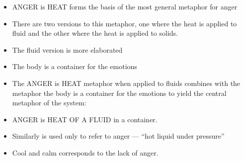 \documentclass[a4paper,landscape,headrule,footrule,xetex]{foils}
\begin{document}

\begin{itemize}
\item ANGER is HEAT forms the basis of the most
  general metaphor for anger
\item There are two versions to this metaphor,
  one where the heat is applied to fluid and
  the other where the heat is applied to
  solids.
\item The fluid version is more elaborated
\end{itemize}

\begin{itemize}
\item The body is a container for the emotions
\begin{exe}
  \ex {}
  \ex {}
  \ex {}
  \ex {}
\end{exe}
\item
The ANGER is HEAT metaphor when applied to fluids combines with the
metaphor the body is a container for the emotions to yield the central
metaphor of the system:
\item ANGER is HEAT OF A FLUID in a container.
\begin{exe}
  \ex {}
  \ex {}
  \ex {}
  \ex {}
  \ex {}
\end{exe}

\item Similarly  is used only to refer to anger --- ``hot liquid under
pressure''
\item Cool and calm corresponds to the lack of anger.
\begin{exe}
  \ex {}
  \ex {}
\end{exe}


\end{itemize}
\end{document}

